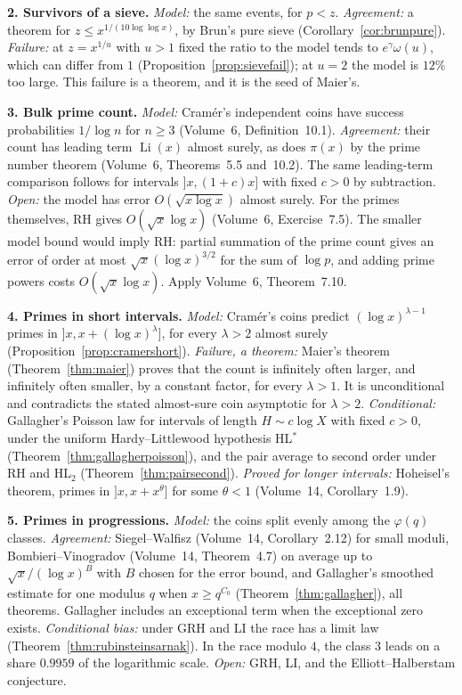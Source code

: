 \medskip\noindent\textbf{2. Survivors of a sieve.} \emph{Model:} the same events, for $p<z$. \emph{Agreement:} a theorem for $z\le x^{1/(10\log\log x)}$, by Brun's pure sieve (Corollary~\ref{cor:brunpure}). \emph{Failure:} at $z=x^{1/u}$ with $u>1$ fixed the ratio to the model tends to $e^\gamma\omega(u)$, which can differ from $1$ (Proposition~\ref{prop:sievefail}); at $u=2$ the model is $12\%$ too large. This failure is a theorem, and it is the seed of Maier's.

\medskip\noindent\textbf{3. Bulk prime count.} \emph{Model:} Cram\'er's independent coins have success probabilities $1/\log n$ for $n\ge3$ (Volume~6, Definition~10.1). \emph{Agreement:} their count has leading term $\operatorname{Li}(x)$ almost surely, as does $\pi(x)$ by the prime number theorem (Volume~6, Theorems~5.5 and~10.2). The same leading-term comparison follows for intervals $]x,(1+c)x]$ with fixed $c>0$ by subtraction. \emph{Open:} the model has error $O(\sqrt{x\log x})$ almost surely. For the primes themselves, RH gives $O(\sqrt x\log x)$ (Volume~6, Exercise~7.5). The smaller model bound would imply RH: partial summation of the prime count gives an error of order at most $\sqrt x(\log x)^{3/2}$ for the sum of $\log p$, and adding prime powers costs $O(\sqrt x\log x)$. Apply Volume~6, Theorem~7.10.

\medskip\noindent\textbf{4. Primes in short intervals.} \emph{Model:} Cram\'er's coins predict $(\log x)^{\lambda-1}$ primes in $]x,x+(\log x)^\lambda]$, for every $\lambda>2$ almost surely (Proposition~\ref{prop:cramershort}). \emph{Failure, a theorem:} Maier's theorem (Theorem~\ref{thm:maier}) proves that the count is infinitely often larger, and infinitely often smaller, by a constant factor, for every $\lambda>1$. It is unconditional and contradicts the stated almost-sure coin asymptotic for $\lambda>2$. \emph{Conditional:} Gallagher's Poisson law for intervals of length $H\sim c\log X$ with fixed $c>0$, under the uniform Hardy--Littlewood hypothesis HL$^*$ (Theorem~\ref{thm:gallagherpoisson}), and the pair average to second order under RH and HL$_2$ (Theorem~\ref{thm:pairsecond}). \emph{Proved for longer intervals:} Hoheisel's theorem, primes in $]x,x+x^\theta]$ for some $\theta<1$ (Volume~14, Corollary~1.9).

\medskip\noindent\textbf{5. Primes in progressions.} \emph{Model:} the coins split evenly among the $\varphi(q)$ classes. \emph{Agreement:} Siegel--Walfisz (Volume~14, Corollary~2.12) for small moduli, Bombieri--Vinogradov (Volume~14, Theorem~4.7) on average up to $\sqrt x/(\log x)^B$ with $B$ chosen for the error bound, and Gallagher's smoothed estimate for one modulus $q$ when $x\ge q^{C_0}$ (Theorem~\ref{thm:gallagher}), all theorems. Gallagher includes an exceptional term when the exceptional zero exists. \emph{Conditional bias:} under GRH and LI the race has a limit law (Theorem~\ref{thm:rubinsteinsarnak}). In the race modulo $4$, the class $3$ leads on a share $0.9959$ of the logarithmic scale. \emph{Open:} GRH, LI, and the Elliott--Halberstam conjecture.

